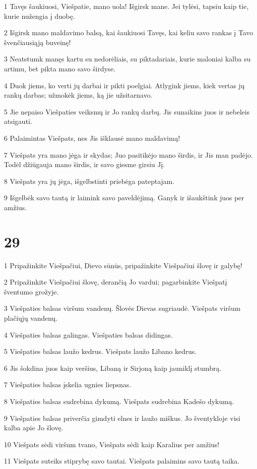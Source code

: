 \par 1 Tavęs šaukiuosi, Viešpatie, mano uola! Išgirsk mane. Jei tylėsi, tapsiu kaip tie, kurie nužengia į duobę. 
\par 2 Išgirsk mano maldavimo balsą, kai šaukiuosi Tavęs, kai keliu savo rankas į Tavo švenčiausiąją buveinę! 
\par 3 Neatstumk manęs kartu su nedorėliais, su piktadariais, kurie maloniai kalba su artimu, bet pikta mano savo širdyse. 
\par 4 Duok jiems, ko verti jų darbai ir pikti poelgiai. Atlygink jiems, kiek vertas jų rankų darbas; užmokėk jiems, ką jie užsitarnavo. 
\par 5 Jie nepaiso Viešpaties veiksmų ir Jo rankų darbų. Jis sunaikins juos ir nebeleis atsigauti. 
\par 6 Palaimintas Viešpats, nes Jis išklausė mano maldavimą! 
\par 7 Viešpats yra mano jėga ir skydas; Juo pasitikėjo mano širdis, ir Jis man padėjo. Todėl džiūgauja mano širdis, ir savo giesme girsiu Jį. 
\par 8 Viešpats yra jų jėga, išgelbstinti priebėga pateptajam. 
\par 9 Išgelbėk savo tautą ir laimink savo paveldėjimą. Ganyk ir išaukštink juos per amžius.



\chapter{29}


\par 1 Pripažinkite Viešpačiui, Dievo sūnūs, pripažinkite Viešpačiui šlovę ir galybę! 
\par 2 Pripažinkite Viešpačiui šlovę, derančią Jo vardui; pagarbinkite Viešpatį šventumo grožyje. 
\par 3 Viešpaties balsas viršum vandenų. Šlovės Dievas sugriaudė. Viešpats viršum plačiųjų vandenų. 
\par 4 Viešpaties balsas galingas. Viešpaties balsas didingas. 
\par 5 Viešpaties balsas laužo kedrus. Viešpats laužo Libano kedrus. 
\par 6 Jis šokdina juos kaip veršius, Libaną ir Sirjoną kaip jauniklį stumbrą. 
\par 7 Viešpaties balsas įskelia ugnies liepsnas. 
\par 8 Viešpaties balsas sudrebina dykumą. Viešpats sudrebina Kadešo dykumą. 
\par 9 Viešpaties balsas priverčia gimdyti elnes ir laužo miškus. Jo šventykloje visi kalba apie Jo šlovę. 
\par 10 Viešpats sėdi viršum tvano, Viešpats sėdi kaip Karalius per amžius! 
\par 11 Viešpats suteiks stiprybę savo tautai. Viešpats palaimins savo tautą taika.



